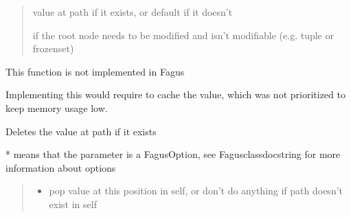 \documentclass[a4paper,10pt,english]{sphinxmanual}
\begin{document}
\begin{fulllineitems}
\begin{fulllineitems}
\begin{quote}
\begin{description}
\begin{itemize}
\end{itemize}

\sphinxAtStartPar
value at path if it exists, or default if it doesn’t

\sphinxAtStartPar
{} \textendash{} if the root node needs to be modified and isn’t modifiable (e.g. tuple or frozenset)

\end{description}\end{quote}

\end{fulllineitems}


\begin{fulllineitems}
\label{\detokenize{fagus:fagus.Fagus.popitem}}
\pysigstartsignatures
{}
\pysigstopsignatures
\sphinxAtStartPar
This function is not implemented in Fagus

\sphinxAtStartPar
Implementing this would require to cache the value, which was not prioritized to keep memory usage low.

\end{fulllineitems}


\begin{fulllineitems}
\label{\detokenize{fagus:fagus.Fagus.discard}}
\pysigstartsignatures
{}
\pysigstopsignatures
\sphinxAtStartPar
Deletes the value at path if it exists

\sphinxAtStartPar
* means that the parameter is a FagusOption, see Fagus\sphinxhyphen{}class\sphinxhyphen{}docstring for more information about options
\begin{quote}\begin{description}
\begin{itemize}
\item {}
\sphinxAtStartPar
{} \textendash{} pop value at this position in self, or don’t do anything if path doesn’t exist in self


\end{itemize}
\end{description}
\end{quote}
\end{fulllineitems}
\end{fulllineitems}
\end{document}
